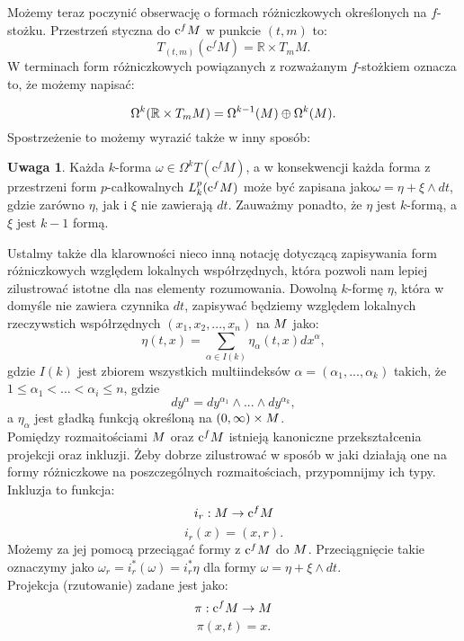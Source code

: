 \documentclass[licencjacka]{pracamgr}
\theoremstyle{definition}
\theoremstyle{definition}
\newtheorem{remark}{Uwaga}[section]
\theoremstyle{plain}
\theoremstyle{plain}
\theoremstyle{plain}
\theoremstyle{plain}
\def\cfm{\ensuremath\mathrm{c}^fM}
\def\M{\ensuremath M}
\begin{document}

Możemy teraz poczynić obserwację o formach różniczkowych określonych na 
$f$-stożku. Przestrzeń styczna do $\cfm$ w punkcie $(t, m)$ to:
\[
    T_{(t, m)} (\mathrm{c}^f M) = \mathbb{R} \times T_m M.
\]
W terminach form różniczkowych powiązanych z rozważanym $f$-stożkiem oznacza
to, że możemy napisać:

\[
\Omega^k(\mathbb{R} \times T_m \M) = 
\Omega^{k-1}(\M)  \oplus \Omega^k(\M).
\]
Spostrzeżenie to możemy wyrazić także w inny sposób: 

\begin{remark}
Każda $k$-forma $\omega \in \Omega^k T(\mathrm{c}^f M)$, 
a w konsekwencji każda forma z przestrzeni form $p$-całkowalnych  $L_k^p
(\cfm)$ może być zapisana jako$\omega = \eta + \xi \wedge dt$,
gdzie zarówno $\eta$, jak i  $\xi$ nie zawierają $dt$.  Zauważmy ponadto,
że $\eta$ jest $k$-formą, a $\xi$ jest $k-1$ formą. \\
\end{remark}

Ustalmy także dla klarowności nieco inną notację dotyczącą zapisywania
form różniczkowych względem lokalnych współrzędnych, która pozwoli nam 
lepiej zilustrować istotne dla nas elementy rozumowania. Dowolną $k$-formę $\eta$,
która w domyśle nie zawiera czynnika $dt$, zapisywać będziemy względem
lokalnych rzeczywstich współrzędnych
$(x_1, x_2, ... , x_n)$ na $\M$ jako:
\[
    \eta(t, x) = \sum_{\alpha \in I(k)} \eta_\alpha (t, x) dx^\alpha,
\]
gdzie $I(k)$ jest zbiorem wszystkich multiindeksów $\alpha = (\alpha_1, ...,
\alpha_k)$ takich, że $1 \leq \alpha_1 < ... < \alpha_i \leq n$, gdzie
\begin{equation}\label{notacja}
    dy^\alpha = dy^{\alpha_1} \wedge ... \wedge dy^{\alpha_k},
\end{equation}
a $\eta_\alpha$ jest gładką funkcją określoną na $(0, \infty) \times \M$. \\

Pomiędzy rozmaitościami $\M$ oraz $\cfm$ istnieją kanoniczne przekształcenia
projekcji oraz inkluzji. Żeby dobrze zilustrować w sposób w jaki działają one
na formy różniczkowe na poszczególnych rozmaitościach, przypomnijmy ich typy.
Inkluzja to funkcja:
\[
    i_r: \M \rightarrow \cfm \\
\]
\[
    i_r(x) = (x, r).
\]
Możemy za jej pomocą przeciągać formy z $\cfm$ do $\M$. Przeciągnięcie takie
oznaczymy jako $\omega_r = i_r^\ast(\omega) = i_r^\ast \eta $ dla formy $\omega
= \eta + \xi \wedge dt$. \\
Projekcja (rzutowanie) zadane jest jako:
\[
    \pi: \cfm \rightarrow \M
\]
\[
    \pi (x, t) = x.
\] \\
\end{document}
